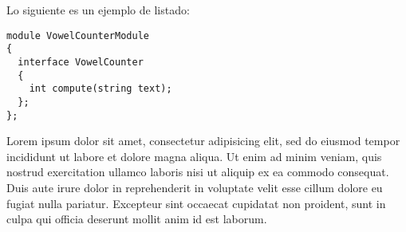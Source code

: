 \par
Lo siguiente es un ejemplo de listado:
\begin{lstlisting}[caption=\textit{VowelCounter.ice}, label=list:firstexample_ice]
module VowelCounterModule
{
  interface VowelCounter
  {
    int compute(string text);
  };
};
\end{lstlisting}
\par
Lorem ipsum dolor sit amet, consectetur adipisicing elit, sed do eiusmod tempor incididunt ut labore et dolore magna aliqua. Ut enim ad minim veniam, quis nostrud exercitation ullamco laboris nisi ut aliquip ex ea commodo consequat. Duis aute irure dolor in reprehenderit in voluptate velit esse cillum dolore eu fugiat nulla pariatur. Excepteur sint occaecat cupidatat non proident, sunt in culpa qui officia deserunt mollit anim id est laborum.
